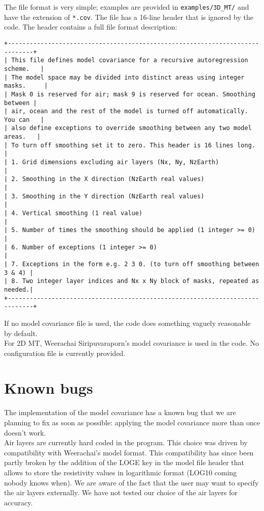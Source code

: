 \documentclass[12pt]{article}
\begin{document}
The file format is very simple; examples are provided in \verb"examples/3D_MT/" and have the extension of \verb"*.cov". The file has a 16-line header that is ignored by the code. The header contains a full file format description:
\begin{verbatim}
+-----------------------------------------------------------------------------+
| This file defines model covariance for a recursive autoregression scheme.   |
| The model space may be divided into distinct areas using integer masks.     |
| Mask 0 is reserved for air; mask 9 is reserved for ocean. Smoothing between |
| air, ocean and the rest of the model is turned off automatically. You can   |
| also define exceptions to override smoothing between any two model areas.   |
| To turn off smoothing set it to zero. This header is 16 lines long.         |
| 1. Grid dimensions excluding air layers (Nx, Ny, NzEarth)                   |
| 2. Smoothing in the X direction (NzEarth real values)                       |
| 3. Smoothing in the Y direction (NzEarth real values)                       |
| 4. Vertical smoothing (1 real value)                                        |
| 5. Number of times the smoothing should be applied (1 integer >= 0)         |
| 6. Number of exceptions (1 integer >= 0)                                    |
| 7. Exceptions in the form e.g. 2 3 0. (to turn off smoothing between 3 & 4) |
| 8. Two integer layer indices and Nx x Ny block of masks, repeated as needed.|
+-----------------------------------------------------------------------------+    
\end{verbatim}

If no model covariance file is used, the code does something vaguely reasonable by default.\\

For 2D MT, Weerachai Siripuvaraporn's model covariance is used in the code. No configuration file is currently provided.\\


\section{Known bugs}

The implementation of the model covariance has a known bug that we are planning to fix as soon as possible: applying the model covariance more than once doesn't work.\\

Air layers are currently hard coded in the program. This choice was driven by compatibility with Weerachai's model format. This compatibility has since been partly broken by the addition of the LOGE key in the model file header that allows to store the resistivity values in logarithmic format (LOG10 coming nobody knows when). We are aware of the fact that the user may want to specify the air layers externally. We have not tested our choice of the air layers for accuracy.\\
\end{document}
